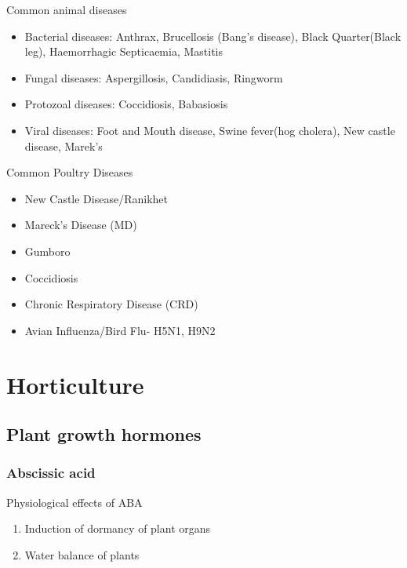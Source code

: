 \documentclass[
  openany]{book}
\providecommand{\tightlist}{%
  \setlength{\itemsep}{0pt}\setlength{\parskip}{0pt}}
\begin{document}
Common animal diseases

\begin{itemize}
\tightlist
\item
  Bacterial diseases: Anthrax, Brucellosis (Bang's disease), Black Quarter(Black leg), Haemorrhagic Septicaemia, Mastitis
\item
  Fungal diseases: Aspergillosis, Candidiasis, Ringworm
\item
  Protozoal diseases: Coccidiosis, Babasiosis
\item
  Viral diseases: Foot and Mouth disease, Swine fever(hog cholera), New castle disease, Marek's
\end{itemize}

Common Poultry Diseases

\begin{itemize}
\tightlist
\item
  New Castle Disease/Ranikhet
\item
  Mareck's Disease (MD)
\item
  Gumboro
\item
  Coccidiosis
\item
  Chronic Respiratory Disease (CRD)
\item
  Avian Influenza/Bird Flu- H5N1, H9N2
\end{itemize}

\hypertarget{horticulture}{%
\chapter{Horticulture}\label{horticulture}}

\hypertarget{plant-growth-hormones}{%
\section{Plant growth hormones}\label{plant-growth-hormones}}

\hypertarget{abscissic-acid}{%
\subsection{Abscissic acid}\label{abscissic-acid}}

Physiological effects of ABA

\begin{enumerate}
\def\labelenumi{\arabic{enumi}.}
\tightlist
\item
  Induction of dormancy of plant organs
\item
  Water balance of plants
\end{enumerate}
\end{document}
